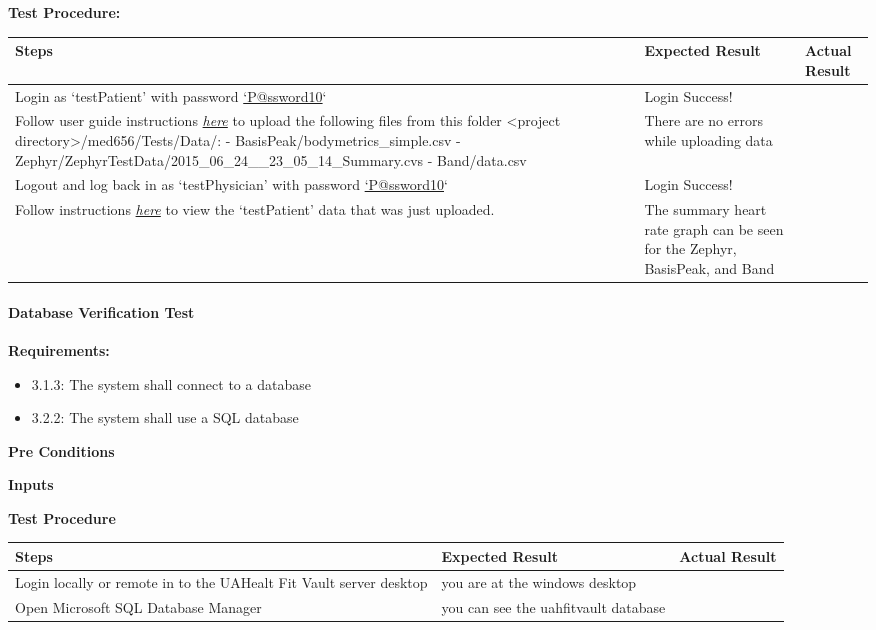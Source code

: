 \documentclass[letterpaper,10pt,english]{sphinxmanual}
\begin{document}
\textbf{Test Procedure:}

\begin{tabulary}{\linewidth}{|L|L|L|}
\hline
\textsf{\relax 
Steps
} & \textsf{\relax 
Expected Result
} & \textsf{\relax 
Actual Result
}\\
\hline
Login as `testPatient' with password \href{mailto:'P@ssword10}{`P@ssword10}`
 & 
Login Success!
 & \\
\hline
Follow user guide instructions {\hyperref[user_guide/patient_data_upload:patient-data-upload]{\emph{here}}} to
upload the following files from this folder
\textless{}project directory\textgreater{}/med656/Tests/Data/:
- BasisPeak/bodymetrics\_simple.csv
- Zephyr/ZephyrTestData/2015\_06\_24\_\_23\_05\_14\_Summary.cvs
- Band/data.csv
 & 
There are no errors while uploading data
 & \\
\hline
Logout and log back in as `testPhysician' with password \href{mailto:'P@ssword10}{`P@ssword10}`
 & 
Login Success!
 & \\
\hline
Follow instructions {\hyperref[user_guide/patient_data_view:view-patient-data-physician]{\emph{here}}} to view
the `testPatient' data that was just uploaded.
 & 
The summary heart rate graph can be seen
for the Zephyr, BasisPeak, and Band
 & \\
\hline\end{tabulary}



\paragraph{Database Verification Test}
\label{STD/manual_test_descriptions:database-verification-test}
\textbf{Requirements:}
\begin{itemize}
\item {} 
3.1.3: The system shall connect to a database

\item {} 
3.2.2: The system shall use a SQL database

\end{itemize}

\textbf{Pre Conditions}

\textbf{Inputs}

\textbf{Test Procedure}

\begin{tabulary}{\linewidth}{|L|L|L|}
\hline
\textsf{\relax 
Steps
} & \textsf{\relax 
Expected Result
} & \textsf{\relax 
Actual Result
}\\
\hline
Login locally or remote in to the UAHealt Fit Vault server desktop
 & 
you are at the windows desktop
 & \\
\hline
Open Microsoft SQL Database Manager
 & 
you can see the uahfitvault database
 & \\
\hline\end{tabulary}
\end{document}
